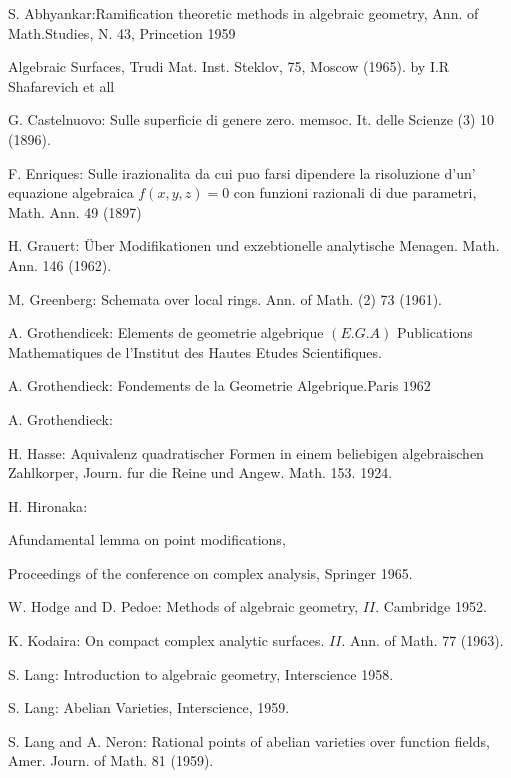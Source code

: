 \begin{thebibliography}{99}
 {S. Abhyankar}:\pageoriginale Ramification theoretic methods in
  algebraic geometry, Ann. of Math.Studies, N. 43, Princetion 1959 

 Algebraic Surfaces, Trudi Mat. Inst. Steklov, 75,
  Moscow (1965). by I.R Shafarevich et all 

 {G. Castelnuovo}: {Sulle superficie di genere
  zero. memsoc. It. delle Scienze (3) 10 (1896).}
 
 {F. Enriques}: {Sulle irazionalita da cui puo farsi
  dipendere la risoluzione d'un' equazione algebraica $f(x,y,z)=0$
  con funzioni razionali di due parametri, Math. Ann. 49 (1897)} 

 {H. Grauert}: {\"Uber Modifikationen und exzebtionelle
  analytische Menagen. Math. Ann. 146 (1962).} 

 {M.  Greenberg}: {Schemata over local rings. Ann. of
  Math. (2) 73 (1961).} 

 {A. Grothendicek}: {Elements de geometrie algebrique
  $(E.G.A)$ Publications Mathematiques de l'Institut des Hautes Etudes
  Scientifiques.} 

 {A. Grothendieck}: {Fondements de la Geometrie Algebrique.Paris
  $1962$} 

 {A. Grothendieck}:  

 {H. Hasse}: {Aquivalenz quadratischer Formen in einem
  beliebigen algebraischen Zahlkorper, Journ. fur die Reine und
  Angew. Math. 153. 1924.} 

 {H. Hironaka}: {Afundamental lemma on point
  modifications,  

  Proceedings of the conference on complex analysis, Springer 1965.}

 {W. Hodge and  D. Pedoe}: { Methods of algebraic geometry,
  $II$. Cambridge 1952.} 

 {K. Kodaira}: {On compact complex analytic
  surfaces. $II$. Ann. of Math. 77 (1963).} 

 {S. Lang}: {Introduction to algebraic geometry, Interscience 1958.}

 {S. Lang}: {Abelian Varieties, Interscience, 1959.}

 {S. Lang and A. Neron}: {Rational points of abelian varieties
  over function fields, Amer. Journ. of Math.  81 (1959).} 


\end{thebibliography}
